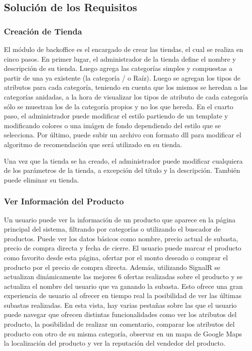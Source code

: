 \documentclass[journal]{IEEEtran}
\begin{document}
\subsection{Solución de los Requisitos}
\subsubsection{Creación de Tienda}
El módulo de backoffice es el encargado de crear las tiendas, el cual se realiza en cinco pasos. En primer lugar, el administrador de la tienda define el nombre y descripción de su tienda. Luego agrega las categorías simples y compuestas a partir de una ya existente (la categoría / o Raíz). Luego se agregan los tipos de atributos para cada categoría, teniendo en cuenta que los mismos se heredan a las categorías anidadas, a la hora de visualizar los tipos de atributo de cada categoría sólo se muestran los de la categoría propios y no los que hereda. En el cuarto paso, el administrador puede modificar el estilo partiendo de un template y modificando colores o una imágen de fondo dependiendo del estilo que se selecciona. Por último, puede subir un archivo con formato dll para modificar el algoritmo de recomendación que será utilizado en su tienda.

Una vez que la tienda se ha creado, el administrador puede modificar cualquiera de los parámetros de la tienda, a excepción del título y la descripción. También puede eliminar su tienda.

\subsubsection{Ver Información del Producto}
Un usuario puede ver la información de un producto que aparece en la página principal del sistema, filtrando por categorías o utilizando el buscador de productos. Puede ver los datos básicos como nombre, precio actual de subasta, precio de compra directa y fecha de cierre. El usuario puede marcar el producto como favorito desde esta página, ofertar por el monto deseado o comprar el producto por el precio de compra directa.
Además, utilizando SignalR se actualizan dinámicamente las mejores 6 ofertas realizadas sobre el producto y se actualiza el nombre del usuario que va ganando la subasta. Esto ofrece una gran experiencia de usuario al ofrecer en tiempo real la posibilidad de ver las últimas subastas realizadas.
En esta vista, hay varias pestañas sobre las que el usuario puede navegar que ofrecen distintas funcionalidades como ver los atributos del producto, la posibilidad de realizar un comentario, comparar los atributos del producto con otro de su misma categoría, observar en un mapa de Google Maps la localización del producto y ver la reputación del vendedor del producto.
\end{document}
